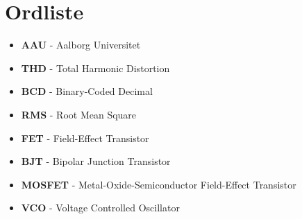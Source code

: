 \section*{Ordliste}
\begin{itemize}
\item \textbf{AAU} - Aalborg Universitet
\item \textbf{THD} - Total Harmonic Distortion
\item \textbf{BCD} - Binary-Coded Decimal
\item \textbf{RMS} - Root Mean Square
\item \textbf{FET} - Field-Effect Transistor
\item \textbf{BJT} - Bipolar Junction Transistor
\item \textbf{MOSFET} - Metal-Oxide-Semiconductor Field-Effect Transistor
\item \textbf{VCO} - Voltage Controlled Oscillator
\end{itemize}

\newpage